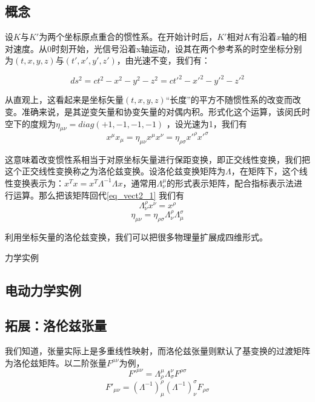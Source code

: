 \subsection{概念}
设$K$与$K'$为两个坐标原点重合的惯性系。在开始计时后，$K'$相对$K$有沿着$x$轴的相对速度。从$0$时刻开始，光信号沿着x轴运动，设其在两个参考系的时空坐标分别为$(t,x,y,z)$与$(t',x',y',z')$，由光速不变，我们有：

$$ds^2=ct^2-x^2-y^2-z^2=ct'^2-x'^2-y'^2-z'^2$$

从直观上，这看起来是坐标矢量$(t,x,y,z)$“长度”的平方不随惯性系的改变而改变。准确来说，是其逆变矢量和协变矢量的对偶内积。形式化这个运算，该闵氏时空下的度规为$\eta_{\mu\nu}=diag(+1,-1,-1,-1) $ ，设光速为1，我们有
\begin{equation}\label{eq_vect2_1}
x^\mu x_\mu =\eta_{\mu\nu}x^\mu x^\nu=\eta_{\rho \sigma}x'^\rho x'^\sigma   
\end{equation}

这意味着改变惯性系相当于对原坐标矢量进行保距变换，即正交线性变换，我们把这个正交线性变换称之为洛伦兹变换。设洛伦兹变换矩阵为$\Lambda$，在矩阵下，这个线性变换表示为：$x^T x=x^T\Lambda^{-1}\Lambda x$，通常用$\Lambda^\mu_\nu $的形式表示矩阵，配合指标表示法进行运算。那么把该矩阵回代\autoref{eq_vect2_1} 我们有
\begin{equation}
\Lambda^\rho_\nu x^\nu=x^\rho
\end{equation}
\begin{equation}
\eta_{\mu\nu}=\eta_{\rho \sigma}\Lambda^\rho_\nu \Lambda^\sigma_\mu 
\end{equation}

利用坐标矢量的洛伦兹变换，我们可以把很多物理量扩展成四维形式。
\begin{exercise}{力学实例}

\end{exercise}
\subsection{电动力学实例}
\subsection{拓展：洛伦兹张量}
我们知道，张量实际上是多重线性映射，而洛伦兹张量则默认了基变换的过渡矩阵为洛伦兹矩阵。以二阶张量$F^{\mu\nu} $为例，
\begin{equation}
F'^{\mu\nu}=\Lambda_\rho^\mu \Lambda_\sigma^\nu F^{\rho\sigma}  
\end{equation}
\begin{equation}
F'_{\mu\nu}=(\Lambda^{-1})_\mu^\rho (\Lambda^{-1})_\nu^\sigma F_{\rho\sigma}
\end{equation}



